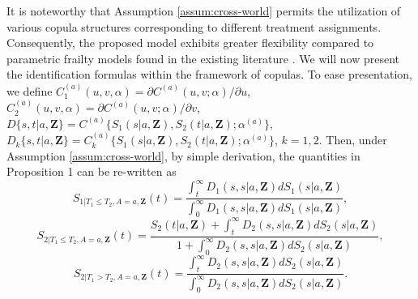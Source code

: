 \documentclass[useAMS,usenatbib,referee]{biom}
\theoremstyle{plain}
\def\red #1{{\color{red}{#1}}}
\def\bfZ{\mathbf{Z}}
\def\Pr{\operatorname{Pr}}
\begin{document}
It is noteworthy that Assumption \ref{assum:cross-world} permits the utilization of various copula structures corresponding to different treatment assignments. Consequently, the proposed model exhibits greater flexibility compared to parametric frailty models found in the existing literature \citep{Nevo2022semicompeting}. We will now present the identification formulas within the framework of copulas. To ease presentation, we define $C_1^{(a)}(u,v,\alpha) = \partial C^{(a)}(u,v;\alpha)/\partial u$, $C_2^{(a)}(u,v,\alpha) = \partial C^{(a)}(u,v;\alpha)/\partial v$,
$ D\{s,t|a,\bfZ\}=C^{(a)}\{S_1(s|a,\bfZ), S_2(t|a,\bfZ);\alpha^{(a)}\},$ 
$ D_{k}\{s,t|a,\bfZ\}=C_k^{(a)}\{S_1(s|a,\bfZ), S_2(t|a,\bfZ);\alpha^{(a)}\}$, $k=1,2$.
Then, under Assumption \ref{assum:cross-world}, by simple derivation, the quantities in Proposition 1 can be re-written as %
\begin{equation}
S_{1|T_1\leq T_2,A=a,\bfZ}(t)
= \frac{\int_t^{\infty} D_1 \left(s,s|a,\bfZ  \right)d S_1(s| a,\bfZ )}{\int_0^{\infty} D_1 \left(s,s|a,\bfZ  \right)d S_1(s| a,\bfZ )},
\label{eq:s1}
\end{equation}
\begin{equation}
S_{2|T_1\leq T_2,A=a,\bfZ}(t)
 = \frac{S_2(t| a,\bfZ )+\int_t^{\infty}D_2 \left(s,s|a,\bfZ  \right)d S_2(s| a,\bfZ )}{ 1+\int_0^{\infty}D_2 \left(s,s|a,\bfZ  \right)d S_2(s| a,\bfZ )},
\label{eq:s2}
\end{equation}
\begin{equation}
S_{2|T_1> T_2,A=a,\bfZ}(t)
= \frac{\int_t^{\infty} D_2 \left(s,s|a,\bfZ  \right)dS_2(s|a,\bfZ)}{\int_0^{\infty} D_2 \left(s,s|a,\bfZ  \right)dS_2(s|a,\bfZ)}. 
\label{eq:s22}
\end{equation}
\end{document}
